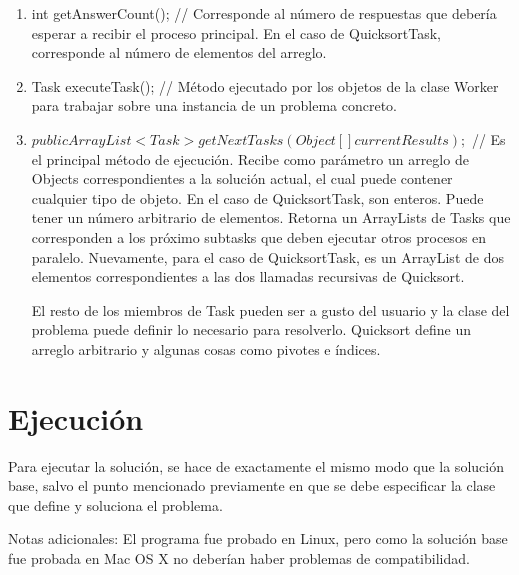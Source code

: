 \documentclass[12pt,spanish]{article}
\begin{document}
	\begin{enumerate}
		\item int getAnswerCount(); // Corresponde al número de respuestas que debería esperar a recibir el proceso principal. En el caso de QuicksortTask, corresponde al número de elementos del arreglo.
		\item Task executeTask(); // Método ejecutado por los objetos de la clase Worker para trabajar sobre una instancia de un problema concreto. 
		\item $public ArrayList<Task> getNextTasks(Object[] currentResults);$ // Es el principal método de ejecución. Recibe como parámetro un arreglo de Objects correspondientes a la solución actual, el cual puede contener cualquier tipo de objeto. En el caso de QuicksortTask, son enteros. Puede tener un número arbitrario de elementos. 
		Retorna un ArrayLists de Tasks que corresponden a los próximo subtasks que deben ejecutar otros procesos en paralelo. Nuevamente, para el caso de QuicksortTask, es un ArrayList de dos elementos correspondientes a las dos llamadas recursivas de Quicksort. 

		El resto de los miembros de Task pueden ser a gusto del usuario y la clase del problema puede definir lo necesario para resolverlo. Quicksort define un arreglo arbitrario y algunas cosas como pivotes e índices.
	\end{enumerate}

	\section{Ejecución}

	Para ejecutar la solución, se hace de exactamente el mismo modo que la solución base, salvo el punto mencionado previamente en que se debe especificar la clase que define y soluciona el problema.

	Notas adicionales: El programa fue probado en Linux, pero como la solución base fue probada en Mac OS X no deberían haber problemas de compatibilidad.
\end{document}

